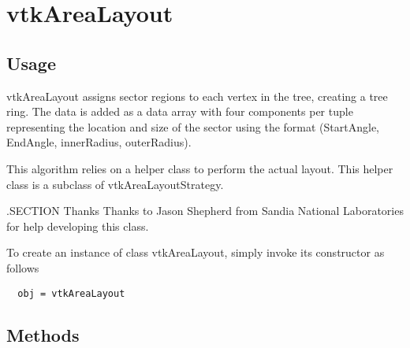 \section{vtkAreaLayout}

\subsection{Usage}

 vtkAreaLayout assigns sector regions to each vertex in the tree,
 creating a tree ring.  The data is added as a data array with four
 components per tuple representing the location and size of the
 sector using the format (StartAngle, EndAngle, innerRadius, outerRadius).

 This algorithm relies on a helper class to perform the actual layout.
 This helper class is a subclass of vtkAreaLayoutStrategy.

 .SECTION Thanks
 Thanks to Jason Shepherd from Sandia National Laboratories
 for help developing this class.

To create an instance of class vtkAreaLayout, simply
invoke its constructor as follows
\begin{verbatim}
  obj = vtkAreaLayout
\end{verbatim}
\subsection{Methods}

